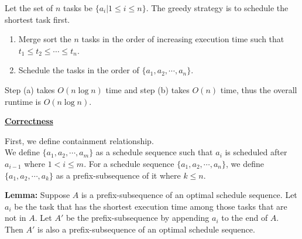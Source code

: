 \documentclass[11pt]{article}
\begin{document}
\begin{enumerate}
\begin{enumerate}
Let the set of $n$ tasks be $\{a_i | 1 \leq i \leq n\}$. The greedy
strategy is to schedule the shortest task first.
\begin{enumerate}
\item Merge sort the $n$ tasks in the order of increasing execution time
such that $t_1 \leq t_2 \leq \cdots \leq t_n$.
\item Schedule the tasks in the order of $\{a_1,a_2,\cdots,a_n\}$.
\end{enumerate}

Step (a) takes $O(n\log n)$ time and step (b) takes $O(n)$ time, thus
the overall runtime is $O(n\log n)$.

\underline{\textbf{Correctness}}

First, we define containment relationship.\\
We define $\{a_1,a_2,\cdots,a_m\}$ as a schedule sequence such that $a_i$
is scheduled after $a_{i-1}$ where $1 < i \leq m$.
For a schedule sequence $\{a_1,a_2,\cdots,a_n\}$, we define
$\{a_1,a_2,\cdots,a_k\}$ as a prefix-subsequence of it where $k \leq n$.

\textbf{Lemma:} Suppose $A$ is a prefix-subsequence of an optimal schedule
sequence. Let $a_i$ be the task that has the shortest execution time
among those tasks that are not in $A$. Let $A'$ be the
prefix-subsequence by appending $a_i$ to the end of $A$.
Then $A'$ is also a prefix-subsequence of an optimal schedule sequence.


\end{enumerate}
\end{enumerate}
\end{document}
